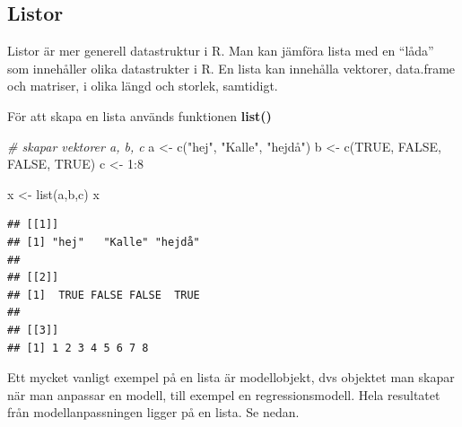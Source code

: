 \documentclass[
]{book}
\newenvironment{Shaded}{\begin{snugshade}}{\end{snugshade}}
\newcommand{\CommentTok}[1]{\textcolor[rgb]{0.56,0.35,0.01}{\textit{#1}}}
\newcommand{\ConstantTok}[1]{\textcolor[rgb]{0.00,0.00,0.00}{#1}}
\newcommand{\DecValTok}[1]{\textcolor[rgb]{0.00,0.00,0.81}{#1}}
\newcommand{\FunctionTok}[1]{\textcolor[rgb]{0.00,0.00,0.00}{#1}}
\newcommand{\NormalTok}[1]{#1}
\newcommand{\OtherTok}[1]{\textcolor[rgb]{0.56,0.35,0.01}{#1}}
\newcommand{\SpecialCharTok}[1]{\textcolor[rgb]{0.00,0.00,0.00}{#1}}
\newcommand{\StringTok}[1]{\textcolor[rgb]{0.31,0.60,0.02}{#1}}
\begin{document}
\hypertarget{listor}{%
\subsection{Listor}\label{listor}}

Listor är mer generell datastruktur i R. Man kan jämföra lista med en ``låda'' som innehåller olika datastrukter i R. En lista kan innehålla vektorer, data.frame och matriser, i olika längd och storlek, samtidigt.

För att skapa en lista används funktionen \textbf{list()}

\begin{Shaded}
\begin{Highlighting}[]
\CommentTok{\# skapar vektorer a, b, c}
\NormalTok{a }\OtherTok{\textless{}{-}} \FunctionTok{c}\NormalTok{(}\StringTok{"hej"}\NormalTok{, }\StringTok{"Kalle"}\NormalTok{, }\StringTok{"hejdå"}\NormalTok{)}
\NormalTok{b }\OtherTok{\textless{}{-}} \FunctionTok{c}\NormalTok{(}\ConstantTok{TRUE}\NormalTok{, }\ConstantTok{FALSE}\NormalTok{, }\ConstantTok{FALSE}\NormalTok{, }\ConstantTok{TRUE}\NormalTok{)}
\NormalTok{c }\OtherTok{\textless{}{-}} \DecValTok{1}\SpecialCharTok{:}\DecValTok{8}

\NormalTok{x }\OtherTok{\textless{}{-}} \FunctionTok{list}\NormalTok{(a,b,c)}
\NormalTok{x}
\end{Highlighting}
\end{Shaded}

\begin{verbatim}
## [[1]]
## [1] "hej"   "Kalle" "hejdå"
## 
## [[2]]
## [1]  TRUE FALSE FALSE  TRUE
## 
## [[3]]
## [1] 1 2 3 4 5 6 7 8
\end{verbatim}

Ett mycket vanligt exempel på en lista är modellobjekt, dvs objektet man skapar när man anpassar en modell, till exempel en regressionsmodell. Hela resultatet från modellanpassningen ligger på en lista. Se nedan.
\end{document}
